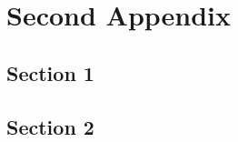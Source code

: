 \chapter{Second Appendix}\label{app:secondAppendix}
  \section{Section 1}\label{sec:A2section1}
    \lipsum[34-36]
  \section{Section 2}\label{sec:A2section2}
    \lipsum[38]